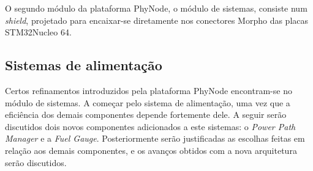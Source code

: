\documentclass[
	12pt,				%
	openright,			%
	oneside,
	a4paper,			%
	english,			%
	french,				%
	spanish,			%
	brazil				%
	]{abntex2}
\begin{document}
O segundo módulo da plataforma PhyNode, o módulo de sistemas, consiste num \textit{shield}, projetado para encaixar-se diretamente nos conectores Morpho das placas STM32Nucleo 64.

\subsection{Sistemas de alimentação}

Certos refinamentos introduzidos pela plataforma PhyNode encontram-se no módulo de sistemas. A começar pelo sistema de alimentação, uma vez que a eficiência dos demais componentes depende fortemente dele. A seguir serão discutidos dois novos componentes adicionados a este sistemas: o \textit{Power Path Manager} e a \textit{Fuel Gauge}. Posteriormente serão justificadas as escolhas feitas em relação aos demais componentes, e os avanços obtidos com a nova arquitetura serão discutidos.
\end{document}
